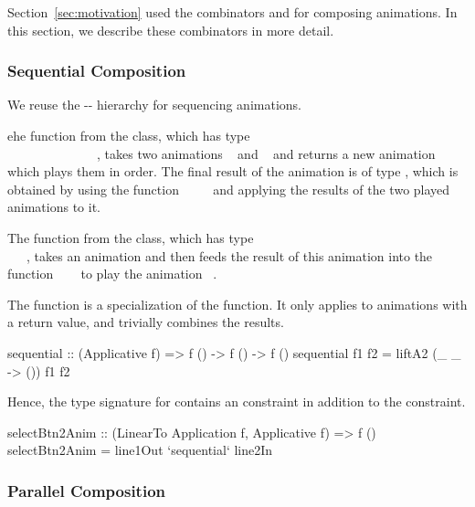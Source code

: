 Section~\ref{sec:motivation} used the combinators  and
 for composing animations. In this section, we describe these combinators in more detail.

\subsubsection{Sequential Composition}

We reuse the -- hierarchy for
sequencing animations.

ehe  function from the  class, which has type \\~\hs{(}~\hs{->}~~\hs{->}~\hs{)}~\hs{->}~~~\hs{->}~~~\hs{->}~~, takes two animations ~ and ~ and returns a new animation which plays them in order. The final result of the animation is of type , which is obtained by using the function ~\hs{->}~~\hs{->}~ and applying the results of the two played animations to it.

The \hs{>>=} function from the  class, which has type ~\hs{=>}~~~\hs{->}\\\hs{(}~\hs{->}~~\hs{)}, takes an animation  and then feeds the result of this animation into the function ~\hs{->}~~ to play the animation ~.


The  function is a specialization of the  function. It only applies to animations with a \hs{()} return value, and trivially combines the results.

\begin{code}
sequential :: (Applicative f) => f () -> f () -> f ()
sequential f1 f2 = liftA2 (\_ _ -> ()) f1 f2
\end{code}

Hence, the type signature for  contains an 
 constraint in addition to the 
constraint.

\begin{code}
selectBtn2Anim :: (LinearTo Application f, Applicative f) => f ()
selectBtn2Anim = line1Out `sequential` line2In
\end{code}

\subsubsection{Parallel Composition}

